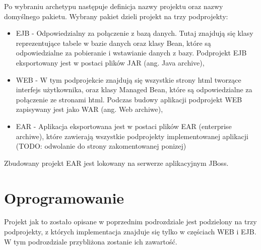 Po wybraniu archetypu następuje definicja nazwy projektu oraz nazwy domyślnego pakietu. Wybrany pakiet dzieli projekt na trzy podprojekty: 
\begin{itemize}
	\item EJB - Odpowiedzialny za połączenie z bazą danych. Tutaj znajdują się klasy reprezentujące tabele w bazie danych oraz klasy Bean, które są odpowiedzialne za pobieranie i wstawianie danych z bazy. Podprojekt EJB eksportowany jest w postaci plików JAR (ang. Java archive),
	\item WEB - W tym podprojekcie znajdują się wszystkie strony html tworzące interfejs użytkownika, oraz klasy Managed Bean, które są odpowiedzialne za połączenie ze stronami html. Podczas budowy aplikacji podprojekt WEB zapisywany jest jako WAR (ang. Web archiwe),
	\item EAR - Aplikacja eksportowana jest w postaci plików EAR (enterprise archiwe), które zawierają wszystkie podprojekty implementowanej aplikacji (TODO: odwolanie do strony zakomentowanej ponizej)
\end{itemize}
Zbudowany projekt EAR jest lokowany na serwerze aplikacyjnym JBoss.\newline

\section{Oprogramowanie}
Projekt jak to zostało opisane w poprzednim podrozdziale jest podzielony na trzy podprojekty, z których implementacja znajduje się tylko w częściach WEB i EJB. W tym podrozdziale przybliżona zostanie ich zawartość.
